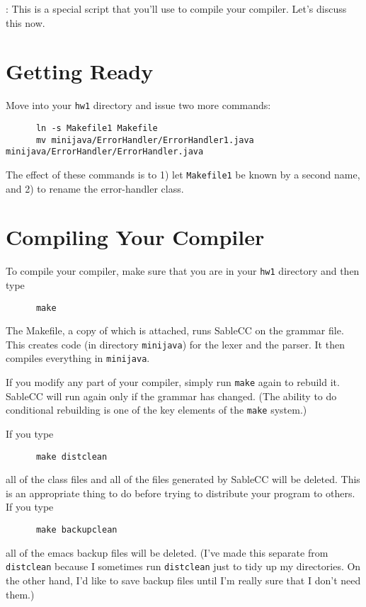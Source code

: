 \documentclass[11pt]{article}
\begin{document}
\mbox{}\par{}:  This is a special script that you'll use to compile your compiler.  Let's discuss this now.


\section{Getting Ready}
Move into your \verb'hw1' directory and issue two more commands:
\begin{verbatim}
      ln -s Makefile1 Makefile
      mv minijava/ErrorHandler/ErrorHandler1.java minijava/ErrorHandler/ErrorHandler.java
\end{verbatim}
The effect of these commands is to 1) let \verb'Makefile1' be known by a second name, and 2) to rename the error-handler class.

\section{Compiling Your Compiler}

To compile your compiler, make sure that you are in your {\tt hw1} directory and then type
\begin{verbatim}
      make
\end{verbatim}
The Makefile, a copy of which is attached, runs SableCC on the grammar file.  This creates code (in directory {\tt minijava}) for the lexer and the parser.  It then compiles everything in {\tt minijava}.

If you modify any part of your compiler, simply run {\tt make} again to rebuild it.  SableCC will run again only if the grammar has changed.  (The ability to do conditional rebuilding is one of the key elements of the {\tt make} system.)

If you type
\begin{verbatim}
      make distclean
\end{verbatim}
all of the class files and all of the files generated by SableCC will be deleted.  This is an appropriate thing to do before trying to distribute your program to others.  If you type
\begin{verbatim}
      make backupclean
\end{verbatim}
all of the emacs backup files will be deleted.  (I've made this separate from {\tt distclean} because I sometimes run {\tt distclean} just to tidy up my directories.  On the other hand, I'd like to save backup files until I'm really sure that I don't need them.)
\end{document}
